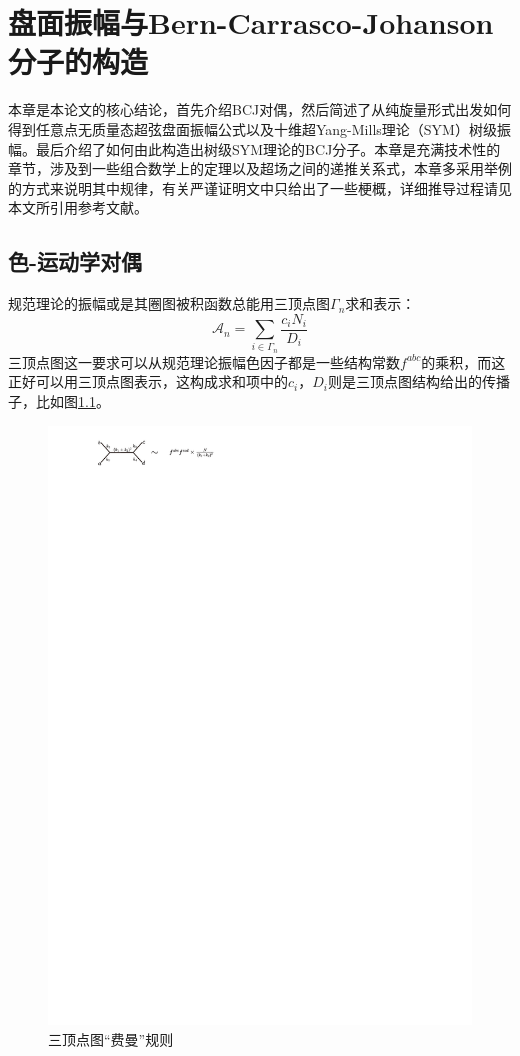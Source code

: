 \chapter{盘面振幅与Bern-Carrasco-Johanson分子的构造}
\label{chap:6}
本章是本论文的核心结论，首先介绍BCJ对偶，然后简述了从纯旋量形式出发如何得到任意点无质量态超弦盘面振幅公式以及十维超Yang-Mills理论（SYM）树级振幅。最后介绍了如何由此构造出树级SYM理论的BCJ分子。本章是充满技术性的章节，涉及到一些组合数学上的定理以及超场之间的递推关系式，本章多采用举例的方式来说明其中规律，有关严谨证明文中只给出了一些梗概，详细推导过程请见本文所引用参考文献。
\section{色-运动学对偶}
规范理论的振幅或是其圈图被积函数总能用三顶点图$\Gamma_n$求和表示：
\begin{equation}
	\label{eq:6.1}
	\mathcal{A}_n=\sum_{i\in\Gamma_n}\frac{c_iN_i}{D_i}
\end{equation}
三顶点图这一要求可以从规范理论振幅色因子都是一些结构常数$f^{abc}$的乘积，而这正好可以用三顶点图表示，这构成求和项中的$c_i$，$D_i$则是三顶点图结构给出的传播子，比如图\ref{fig:6.1}。

\begin{figure}[htbp]
	\centering
	\includegraphics[width=0.8\linewidth]{figs/fig8.pdf}
	\caption{三顶点图“费曼”规则}
	\label{fig:6.1}
\end{figure}

